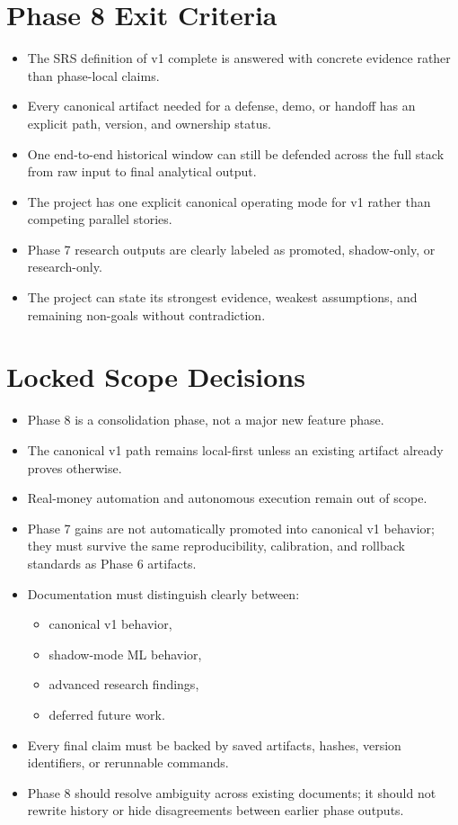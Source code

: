 \documentclass{article}
\begin{document}
\section*{Phase 8 Exit Criteria}
\begin{itemize}
\item The SRS definition of v1 complete is answered with concrete evidence rather than phase-local claims.
\item Every canonical artifact needed for a defense, demo, or handoff has an explicit path, version, and ownership status.
\item One end-to-end historical window can still be defended across the full stack from raw input to final analytical output.
\item The project has one explicit canonical operating mode for v1 rather than competing parallel stories.
\item Phase 7 research outputs are clearly labeled as promoted, shadow-only, or research-only.
\item The project can state its strongest evidence, weakest assumptions, and remaining non-goals without contradiction.
\end{itemize}

\section*{Locked Scope Decisions}
\begin{itemize}
\item Phase 8 is a consolidation phase, not a major new feature phase.
\item The canonical v1 path remains local-first unless an existing artifact already proves otherwise.
\item Real-money automation and autonomous execution remain out of scope.
\item Phase 7 gains are not automatically promoted into canonical v1 behavior; they must survive the same reproducibility, calibration, and rollback standards as Phase 6 artifacts.
\item Documentation must distinguish clearly between:
\begin{itemize}
\item canonical v1 behavior,
\item shadow-mode ML behavior,
\item advanced research findings,
\item deferred future work.
\end{itemize}
\item Every final claim must be backed by saved artifacts, hashes, version identifiers, or rerunnable commands.
\item Phase 8 should resolve ambiguity across existing documents; it should not rewrite history or hide disagreements between earlier phase outputs.
\end{itemize}
\end{document}

